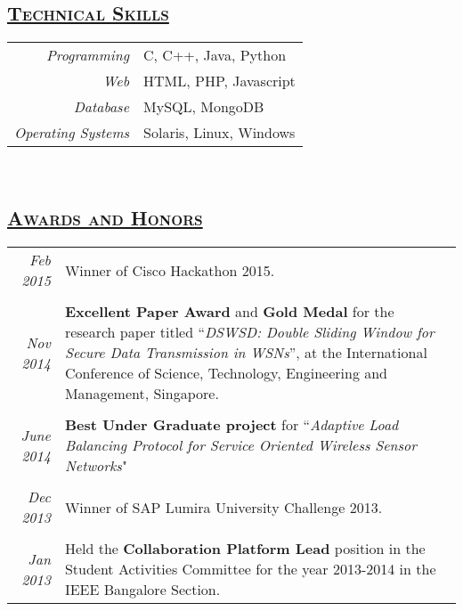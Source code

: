 \documentclass[14pt]{article}
\begin{document}
\subsection* {\scshape\LARGE\uline {Technical Skills}}
\begin{tabular}{r l}
\emph{Programming} & C, C++, Java, Python \\
\emph{Web}              & HTML, PHP, Javascript \\
\emph{Database}	  & MySQL, MongoDB \\
\emph{Operating Systems} & Solaris, Linux, Windows
\end{tabular}
\\
\subsection* {\scshape\LARGE\uline {Awards and Honors}}
\begin{tabularx}{\textwidth}{r X}
\emph{Feb 2015} & Winner of Cisco Hackathon 2015.\\ \\
\emph{Nov 2014} & \textbf{Excellent Paper Award} and \textbf{Gold Medal} for the research paper  titled ``\emph{DSWSD: Double Sliding Window for Secure Data Transmission in WSNs}'', at the International Conference of Science, Technology, Engineering and Management, Singapore. \\ \\
\emph{June 2014} & \textbf{Best Under Graduate project} for ``\emph{Adaptive Load Balancing Protocol for Service Oriented Wireless Sensor Networks}" \\ \\
\emph{Dec 2013} & Winner of SAP Lumira University Challenge 2013. \\ \\
\emph{Jan 2013} & Held the \textbf{Collaboration Platform Lead} position in the Student Activities Committee for the year 2013-2014 in the IEEE Bangalore Section. 
\end{tabularx}
\\
\end{document}
